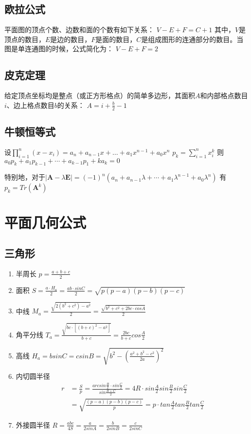 	\subsection{欧拉公式}
		平面图的顶点个数、边数和面的个数有如下关系：
			$V - E + F = C+ 1$
		\indent 其中，$V$是顶点的数目，$E$是边的数目，$F$是面的数目，$C$是组成图形的连通部分的数目。当图是单连通图的时候，公式简化为：
			$V - E + F = 2$
	\subsection{皮克定理}
		给定顶点坐标均是整点（或正方形格点）的简单多边形，其面积$A$和内部格点数目$i$、边上格点数目$b$的关系：
			$A = i + \frac{b}{2} - 1$
	\subsection{牛顿恒等式}
		设$\prod_{i = 1}^n{(x - x_i)} = a_n + a_{n - 1} x + \dots + a_1 x^{n - 1} + a_0 x^n$
		$p_k = \sum_{i = 1}^n{x_i^k}$
		则$a_0 p_k + a_1 p_{k - 1} + \cdots + a_{k - 1} p_1 + k a_k = 0$\par
		特别地，对于$|\bm{A} - \lambda \bm{E}| = (-1)^n(a_n + a_{n - 1} \lambda + \cdots + a_1 \lambda^{n - 1} + a_0 \lambda^n)$
		有$p_k = Tr(\bm{A}^k)$
\section{平面几何公式}
	\subsection{三角形}
		\begin{enumerate}\setlength{\itemsep}{-\itemsep}
			\item 半周长
				$p=\frac{a+b+c}{2}$
			\item 面积
				$S=\frac{a \cdot H_a}{2}=\frac{ab \cdot sinC}{2}=\sqrt{p(p-a)(p-b)(p-c)}$
			\item 中线
				$M_a=\frac{\sqrt{2(b^2+c^2)-a^2}}{2}=\frac{\sqrt{b^2+c^2+2bc \cdot cosA}}{2}$
			\item 角平分线 
				$T_a=\frac{\sqrt{bc \cdot [(b+c)^2-a^2]}}{b+c}=\frac{2bc}{b+c}cos\frac{A}{2}$
			\item 高线
				$H_a=bsinC=csinB=\sqrt{b^2-(\frac{a^2+b^2-c^2}{2a})^2}$
			\item 内切圆半径
				\begin{align*}
					r&=\frac{S}{p}=\frac{arcsin\frac{B}{2} \cdot sin\frac{C}{2}}{sin\frac{B+C}{2}}=4R \cdot sin\frac{A}{2}sin\frac{B}{2}sin\frac{C}{2}\\
					&=\sqrt{\frac{(p-a)(p-b)(p-c)}{p}}=p \cdot tan\frac{A}{2}tan\frac{B}{2}tan\frac{C}{2}
				\end{align*}
			\item 外接圆半径
				$R=\frac{abc}{4S}=\frac{a}{2sinA}=\frac{b}{2sinB}=\frac{c}{2sinC}$
		\end{enumerate}

